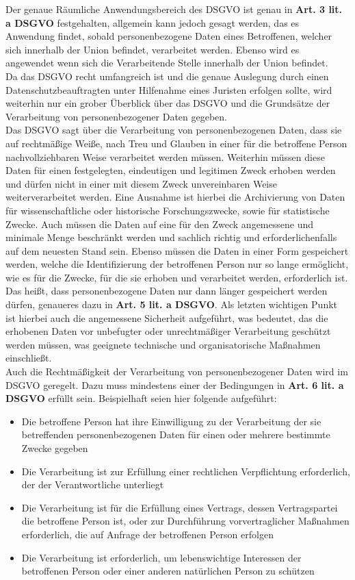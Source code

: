 \documentclass[a4paper, 12pt]{article}
\begin{document}
Der genaue Räumliche Anwendungsbereich des DSGVO ist genau in \textbf{Art. 3 lit. a DSGVO} festgehalten, allgemein kann jedoch gesagt werden, das es Anwendung findet, sobald personenbezogene Daten eines Betroffenen, welcher sich innerhalb der Union befindet, verarbeitet werden. Ebenso wird es angewendet wenn sich die Verarbeitende Stelle innerhalb der Union befindet.\\Da das DSGVO recht umfangreich ist und die genaue Auslegung durch einen Datenschutzbeauftragten unter Hilfenahme eines Juristen erfolgen sollte, wird weiterhin nur ein grober Überblick über das DSGVO und die Grundsätze der Verarbeitung von personenbezogener Daten gegeben.
\\Das DSGVO sagt über die Verarbeitung von personenbezogenen Daten, dass sie auf rechtmäßige Weiße, nach Treu und Glauben in einer für die betroffene Person nachvollziehbaren Weise verarbeitet werden müssen. Weiterhin müssen diese Daten für einen festgelegten, eindeutigen und legitimen Zweck erhoben werden und dürfen nicht in einer mit diesem Zweck unvereinbaren Weise weiterverarbeitet werden. Eine Ausnahme ist hierbei die Archivierung von Daten für wissenschaftliche oder historische Forschungszwecke, sowie für statistische Zwecke. Auch müssen die Daten auf eine für den Zweck angemessene und minimale Menge beschränkt werden und sachlich richtig und erforderlichenfalls auf dem neuesten Stand sein. Ebenso müssen die Daten in einer Form gespeichert werden, welche die Identifizierung der betroffenen Person nur so lange ermöglicht, wie es für die Zwecke, für die sie erhoben und verarbeitet werden, erforderlich ist. Das heißt, dass personenbezogene Daten nur dann länger gespeichert werden dürfen, genaueres dazu in \textbf{Art. 5 lit. a DSGVO}. Als letzten wichtigen Punkt ist hierbei auch die angemessene Sicherheit aufgeführt, was bedeutet, das die erhobenen Daten vor unbefugter oder unrechtmäßiger Verarbeitung geschützt werden müssen, was geeignete technische und organisatorische Maßnahmen einschließt.
\\Auch die Rechtmäßigkeit der Verarbeitung von personenbezogener Daten wird im DSGVO geregelt. Dazu muss mindestens einer der Bedingungen in \textbf{Art. 6 lit. a DSGVO} erfüllt sein. Beispielhaft seien hier folgende aufgeführt:
\begin{itemize}
	\item Die betroffene Person hat ihre Einwilligung zu der Verarbeitung der sie betreffenden personenbezogenen Daten für einen oder mehrere bestimmte Zwecke gegeben
	\item Die Verarbeitung ist zur Erfüllung einer rechtlichen Verpflichtung erforderlich, der der Verantwortliche unterliegt
	\item Die Verarbeitung ist für die Erfüllung eines Vertrags, dessen Vertragspartei die betroffene Person ist, oder zur Durchführung vorvertraglicher Maßnahmen erforderlich, die auf Anfrage der betroffenen Person erfolgen
	\item Die Verarbeitung ist erforderlich, um lebenswichtige Interessen der betroffenen Person oder einer anderen natürlichen Person zu schützen
\end{itemize}\label{verarbeitung_recht}
\end{document}
